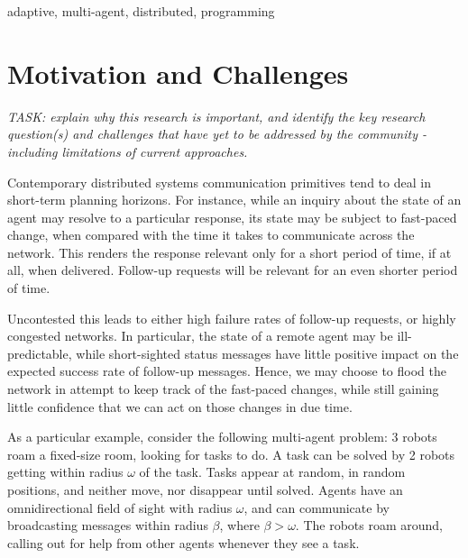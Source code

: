 \documentclass[conference]{IEEEtran}
\begin{document}
\begin{IEEEkeywords}
adaptive, multi-agent, distributed, programming
\end{IEEEkeywords}

\section{Motivation and Challenges}

\emph{TASK: explain why this research is important, and identify the
key research question(s) and challenges that have yet to be addressed
by the community - including limitations of current approaches.}

Contemporary distributed systems communication primitives tend to deal
in short-term planning horizons. For instance, while an inquiry about
the state of an agent may resolve to a particular response, its state
may be subject to fast-paced change, when compared with the time it
takes to communicate across the network. This renders the response
relevant only for a short period of time, if at all, when delivered.
Follow-up requests will be relevant for an even shorter period of
time.

Uncontested this leads to either high failure rates of follow-up
requests, or highly congested networks. In particular, the state of a
remote agent may be ill-predictable, while short-sighted status
messages have little positive impact on the expected success rate of
follow-up messages. Hence, we may choose to flood the network in
attempt to keep track of the fast-paced changes, while still gaining
little confidence that we can act on those changes in due time.


As a particular example, consider the following multi-agent problem: 3
robots roam a fixed-size room, looking for tasks to do. A task can be
solved by 2 robots getting within radius $\omega$ of the task. Tasks
appear at random, in random positions, and neither move, nor disappear
until solved. Agents have an omnidirectional field of sight with
radius $\omega$, and can communicate by broadcasting messages within
radius $\beta$, where $\beta>\omega$. The robots roam around, calling
out for help from other agents whenever they see a task.
\end{document}
